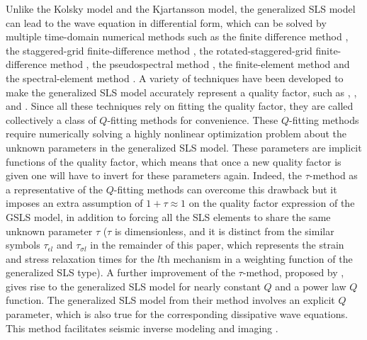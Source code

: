 \documentclass[article]{./macros/elsarticle_qh}
\begin{document}
Unlike the Kolsky model and the Kjartansson model, the generalized SLS model can lead to the wave equation in differential form, which can be solved by multiple time-domain numerical methods such as the finite difference method \citep[e.g.,][]{carcione:1988b}, the staggered-grid finite-difference method \citep[e.g.,][]{bohlen:2002,bai.tsvankin:2016}, the rotated-staggered-grid finite-difference method \citep[e.g.,][]{saenger:2004}, the pseudospectral method \citep[e.g.,][]{carcione:1993}, the finite-element method \citep[e.g.,][]{ham:2012} and the spectral-element method \citep[e.g.,][]{komatitsch.trump:1999}. A variety of techniques have been developed to make the generalized SLS model accurately represent a quality factor, such as \cite{liu:1976}, \cite{emmerich:1987}, \cite{blanch:1995} and \cite{blanc:2016}. Since all these techniques rely on fitting the quality factor, they are called collectively a class of $Q$-fitting methods for convenience. These $Q$-fitting methods require numerically solving a highly nonlinear optimization problem about the unknown parameters in the generalized SLS model. These parameters are implicit functions of the quality factor, which means that once a new quality factor is given one will have to invert for these parameters again. Indeed, the $\tau$-method \cite[]{blanch:1995} as a representative of the $Q$-fitting methods can overcome this drawback but it imposes an extra assumption of $1 + \tau \approx 1$ on the quality factor expression of the GSLS model, in addition to forcing all the SLS elements to share the same unknown parameter $\tau$ ($\tau$ is dimensionless, and it is distinct from the similar symbols $\tau_{\epsilon l}$ and $\tau_{\sigma l}$ in the remainder of this paper, which represents the strain and stress relaxation times for the $l$th mechanism in a weighting function of the generalized SLS type). 
A further improvement of the $\tau$-method, proposed by \cite{fichtner:2014}, gives rise to the generalized SLS model for nearly constant $Q$ and a power law $Q$ function. The generalized SLS model from their method involves an explicit $Q$ parameter, which is also true for the corresponding dissipative wave equations. This method facilitates seismic inverse modeling \cite[]{fichtner:2014} and imaging \cite[]{guo:2018}.   
\end{document}

